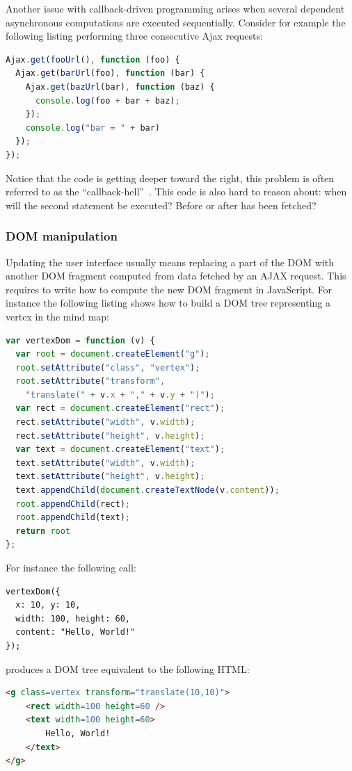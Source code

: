 \documentclass[american,english,runningheads]{llncs}
\begin{document}
Another issue with callback-driven programming arises when several dependent asynchronous computations are executed
sequentially. Consider for example the following listing performing three consecutive Ajax requests:

\begin{lstlisting}[language=JavaScript,label=async-callback-hell,caption=Sequential asynchronous calls]
Ajax.get(fooUrl(), function (foo) {
  Ajax.get(barUrl(foo), function (bar) {
    Ajax.get(bazUrl(bar), function (baz) {
      console.log(foo + bar + baz);
    });
    console.log("bar = " + bar)
  });
});
\end{lstlisting}

Notice that the code is getting deeper toward the right, this problem is often referred to as the
“callback-hell”~\cite{McKenna_Roy}. This code is also hard to reason about: when will the second 
statement be executed? Before or after  has been fetched?

\subsubsection{DOM manipulation}
\label{forest}

Updating the user interface usually means replacing a part of the DOM with another DOM fragment computed from data
fetched by an AJAX request. This requires to write how to compute the new DOM fragment in JavaScript. For instance
the following listing shows how to build a DOM tree representing a vertex in the mind map:

\begin{lstlisting}[language=JavaScript,label=dom-api,caption=DOM fragment creation using the native API]
var vertexDom = function (v) {
  var root = document.createElement("g");
  root.setAttribute("class", "vertex");
  root.setAttribute("transform",
    "translate(" + v.x + "," + v.y + ")");
  var rect = document.createElement("rect");
  rect.setAttribute("width", v.width);
  rect.setAttribute("height", v.height);
  var text = document.createElement("text");
  text.setAttribute("width", v.width);
  text.setAttribute("height", v.height);
  text.appendChild(document.createTextNode(v.content));
  root.appendChild(rect);
  root.appendChild(text);
  return root
};
\end{lstlisting}

For instance the following call:
\begin{lstlisting}
vertexDom({
  x: 10, y: 10,
  width: 100, height: 60,
  content: "Hello, World!"
});
\end{lstlisting}
produces a DOM tree equivalent to the following HTML:
\begin{lstlisting}[language=HTML]
<g class=vertex transform="translate(10,10)">
    <rect width=100 height=60 />
    <text width=100 height=60>
        Hello, World!
    </text>
</g>
\end{lstlisting}
\end{document}
